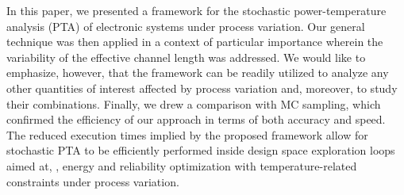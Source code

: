 In this paper, we presented a framework for the stochastic power-temperature analysis (PTA) of electronic systems under process variation.
Our general technique was then applied in a context of particular importance wherein the variability of the effective channel length was addressed.
We would like to emphasize, however, that the framework can be readily utilized to analyze any other quantities of interest affected by process variation and, moreover, to study their combinations.
Finally, we drew a comparison with MC sampling, which confirmed the efficiency of our approach in terms of both accuracy and speed.
The reduced execution times implied by the proposed framework allow for stochastic PTA to be efficiently performed inside design space exploration loops aimed at, \eg, energy and reliability optimization with temperature-related constraints under process variation.
